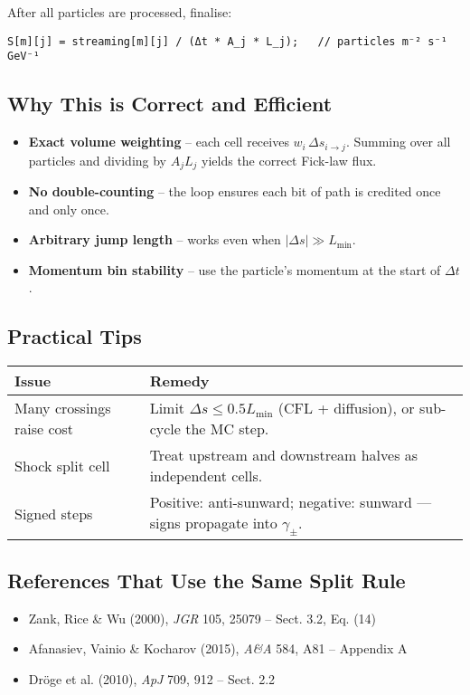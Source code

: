 After all particles are processed, finalise:
\begin{lstlisting}
S[m][j] = streaming[m][j] / (Δt * A_j * L_j);   // particles m⁻² s⁻¹ GeV⁻¹
\end{lstlisting}

\subsection*{Why This is Correct and Efficient}
\begin{itemize}
    \item \textbf{Exact volume weighting} – each cell receives $w_i\,\Delta s_{i\to j}$. Summing over all particles and dividing by $A_j L_j$ yields the correct Fick-law flux.
    \item \textbf{No double-counting} – the loop ensures each bit of path is credited once and only once.
    \item \textbf{Arbitrary jump length} – works even when $|\Delta s|\gg L_{\min}$.
    \item \textbf{Momentum bin stability} – use the particle’s momentum at the start of $\Delta t$.
\end{itemize}

\subsection*{Practical Tips}
\begin{tabular}{@{}p{5cm}p{10cm}@{}}
\toprule
\textbf{Issue} & \textbf{Remedy} \\
\midrule
Many crossings raise cost &
Limit $\Delta s \le 0.5 L_{\min}$ (CFL + diffusion), or sub-cycle the MC step. \\
Shock split cell &
Treat upstream and downstream halves as independent cells. \\
Signed steps &
Positive: anti-sunward; negative: sunward — signs propagate into $\gamma_\pm$. \\
\bottomrule
\end{tabular}

\subsection*{References That Use the Same Split Rule}
\begin{itemize}
    \item Zank, Rice \& Wu (2000), \emph{JGR} 105, 25079 – Sect. 3.2, Eq. (14)
    \item Afanasiev, Vainio \& Kocharov (2015), \emph{A\&A} 584, A81 – Appendix A
    \item Dröge et al. (2010), \emph{ApJ} 709, 912 – Sect. 2.2
\end{itemize}

